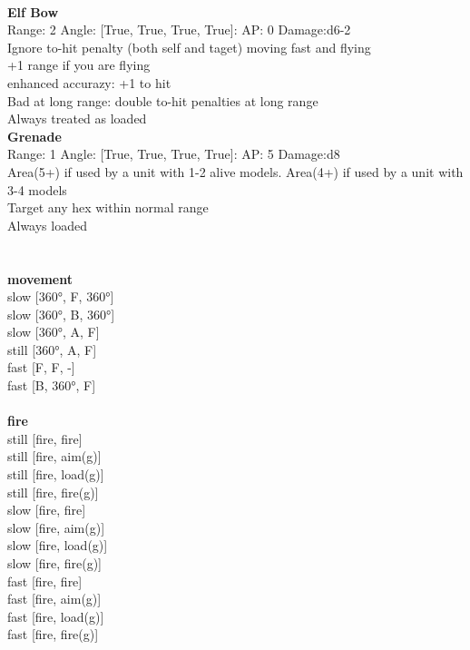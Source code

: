\ \\
{\bf Elf Bow } \\



Range: 2  Angle: [True, True, True, True]: AP: 0 Damage:d6-2 \\
Ignore to-hit penalty (both self and taget) moving fast and flying\\ 
+1 range if you are flying\\ 
enhanced accurazy: +1 to hit\\ 
Bad at long range: double to-hit penalties at long range\\ 
Always treated as loaded\\ 




{\bf Grenade } \\



Range: 1  Angle: [True, True, True, True]: AP: 5 Damage:d8 \\
Area(5+) if used by a unit with 1-2 alive models. Area(4+) if used by a unit with 3-4 models\\ 
Target any hex within normal range\\ 
Always loaded\\ 




 
\ \\



\ \\ {\bf movement } \\
slow [360°, F, 360°] \\
slow [360°, B, 360°] \\
slow [360°, A, F] \\
still [360°, A, F] \\
fast [F, F, -] \\
fast [B, 360°, F] \\
\ \\ {\bf fire } \\
still [fire, fire] \\
still [fire, aim(g)] \\
still [fire, load(g)] \\
still [fire, fire(g)] \\
slow [fire, fire] \\
slow [fire, aim(g)] \\
slow [fire, load(g)] \\
slow [fire, fire(g)] \\
fast [fire, fire] \\
fast [fire, aim(g)] \\
fast [fire, load(g)] \\
fast [fire, fire(g)] \\


